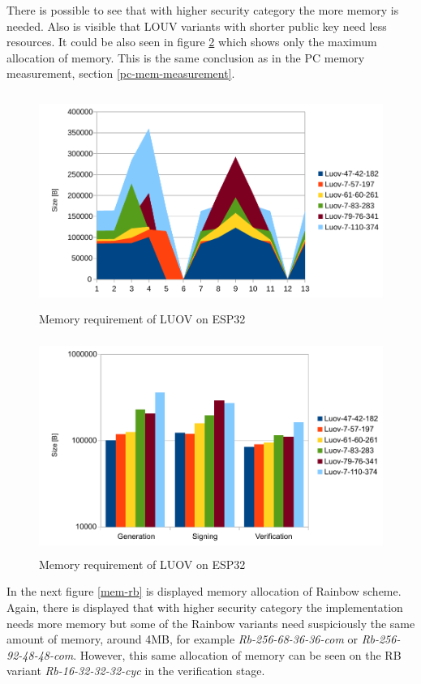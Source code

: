 \documentclass[thesis=M,english]{FITthesis}[2019/12/23]
\begin{document}
\bigskip
\noindent
There is possible to see that with higher security category the more memory is needed. Also is visible that LOUV variants with shorter public key need less resources. It could be also seen in figure \ref{mem-luov} which shows only the maximum allocation of memory. This is the same conclusion as in the PC memory measurement, section \ref{pc-mem-measurement}.

\newpage
\bigskip\bigskip
\begin{figure}[H]
\centering
\includegraphics[width=13cm,height=7cm]{images/mem-luov0.pdf}
\caption{Memory requirement of LUOV on ESP32}
\label{mem-luov0}
\end{figure}

\bigskip\bigskip\bigskip
\begin{figure}[H]
\centering
\includegraphics[width=13cm,height=7cm]{images/mem-luov.pdf}
\caption{Memory requirement of LUOV on ESP32}
\label{mem-luov}
\end{figure}

\newpage
\noindent
In the next figure \ref{mem-rb} is displayed memory allocation of Rainbow scheme. Again, there is displayed that with higher security category the implementation needs more memory but some of the Rainbow variants need suspiciously the same amount of memory, around 4MB, for example \textit{Rb-256-68-36-36-com} or \textit{Rb-256-92-48-48-com}. However, this same allocation of memory can be seen on the RB variant \textit{Rb-16-32-32-32-cyc} in the verification stage. 
\end{document}
